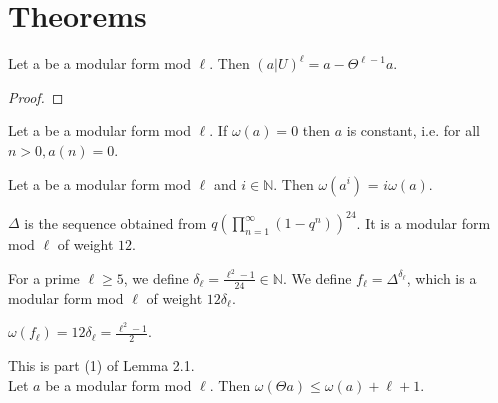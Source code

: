 \section{Theorems}

\begin{theorem}
  \label{thm:U_pow_l_eq_self_sub_Theta_pow_l_sub_one}
  \leanok
  Let a be a modular form mod $\ell$. Then $(a|U) ^ \ell = a - \Theta^{\ell - 1} a$.
\end{theorem}
\begin{proof}
  \leanok
\end{proof}


\begin{lemma}
  \label{lem:const_of_Filt_zero}
  \leanok
  Let a be a modular form mod $\ell$. If $\omega (a) = 0$ then $a$ is constant, 
  i.e. for all $n > 0, a(n) = 0$.
\end{lemma}

\begin{theorem}
  \label{thm:Filtration_Log}
  \leanok
  Let a be a modular form mod $\ell$ and $i \in \mathbb{N}$. 
  Then $\omega (a ^ i)$ = $i \omega (a)$.
\end{theorem}

\begin{definition}[Delta]
  \label{def:Delta}
  \leanok
  
  $\Delta$ is the sequence obtained from $q (\prod_{n = 1}^{\infty} (1 - q^n))^{24}$.
  It is a modular form mod $\ell$ of weight $12$. 
\end{definition}

\begin{definition}
  \label{def:f_l}
  \leanok
  For a prime $\ell \ge 5$, we define $\delta_\ell = \frac{\ell^2 - 1}{24} \in \mathbb{N}$. 
  We define $f_\ell = \Delta^{\delta_\ell}$, which is a modular form mod $\ell$ of weight $12 \delta_\ell$. 
\end{definition}

\begin{lemma}
  \label{lem:Filt_fl}
  \leanok
  $ \omega (f_\ell) = 12 \delta_\ell = \frac{\ell^2 - 1}{2}.$
\end{lemma}

\begin{theorem}
  \label{thm:Filt_Theta_bound}
  \leanok
  This is part (1) of Lemma 2.1. \\
  Let $a$ be a modular form mod $\ell$. Then $\omega (\Theta a) \le \omega (a) + \ell + 1$.
\end{theorem}

